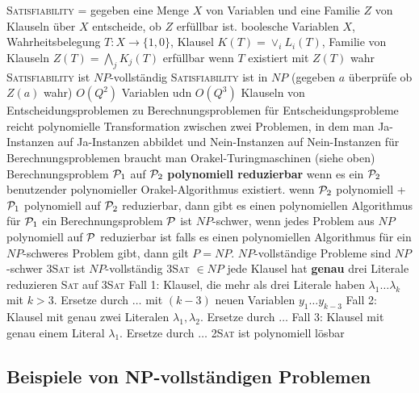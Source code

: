 \begin{outline}
    \1 \textsc{Satisfiability} = gegeben eine Menge $X$ von Variablen und eine Familie $Z$ von Klauseln über $X$ entscheide, ob $Z$ erfüllbar ist. 
        \2 boolesche Variablen $X$, Wahrheitsbelegung $T:X\rightarrow \{1,0\}$, Klausel $K(T)=\lor_i L_i(T)$, Familie von Klauseln $Z(T)=\bigwedge_j K_j(T)$
        \2 erfüllbar wenn $T$ existiert mit $Z(T)$ wahr
    \1 \textsc{Satisfiability} ist $NP$-vollständig
        \2 \textsc{Satisfiability} ist in $NP$ (gegeben $a$ überprüfe ob $Z(a)$ wahr)
        \2 $O(Q^2)$ Variablen udn $O(Q^3)$ Klauseln
    \1 von Entscheidungsproblemen zu Berechnungsproblemen
        \2 für Entscheidungsprobleme reicht polynomielle Transformation zwischen zwei Problemen, in dem man Ja-Instanzen auf Ja-Instanzen abbildet und Nein-Instanzen auf Nein-Instanzen
        \2 für Berechnungsproblemen braucht man Orakel-Turingmaschinen (siehe oben)
        \2 Berechnungsproblem $\mathcal{P}_1$ auf $\mathcal{P}_2$ \textbf{polynomiell reduzierbar} wenn es ein $\mathcal{P}_2$ benutzender polynomieller Orakel-Algorithmus existiert.
    \1 wenn $\mathcal{P}_2$ polynomiell + $\mathcal{P}_1$ polynomiell auf $\mathcal{P}_2$ reduzierbar, dann gibt es einen polynomiellen Algorithmus für $\mathcal{P}_1$ 
    \1 ein Berechnungsproblem $\mathcal{P}$ ist $NP$-schwer, wenn jedes Problem aus $NP$ polynomiell auf $\mathcal{P}$ reduzierbar ist
        \2 falls es einen polynomiellen Algorithmus für ein $NP$-schweres Problem gibt, dann gilt $P=NP$.
        \2 $NP$-vollständige Probleme sind $NP$-schwer
    \1 \textsc{3Sat} ist $NP$-vollständig
        \2 \textsc{3Sat} $\in NP$
        \2 jede Klausel hat \textbf{genau} drei Literale
        \2 reduzieren \textsc{Sat} auf \textsc{3Sat}
            \3 Fall 1: Klausel, die mehr als drei Literale haben $\lambda_1\ldots\lambda_k$ mit $k>3$. Ersetze durch $\ldots$ mit $(k-3)$ neuen Variablen $y_1\ldots y_{k-3}$
            \3 Fall 2: Klausel mit genau zwei Literalen $\lambda_1,\lambda_2$. Ersetze durch $\ldots$
            \3 Fall 3: Klausel mit genau einem Literal $\lambda_1$. Ersetze durch $\ldots$
    \1 \textsc{2Sat} ist polynomiell lösbar
\end{outline}

\subsection{Beispiele von NP-vollständigen Problemen}


